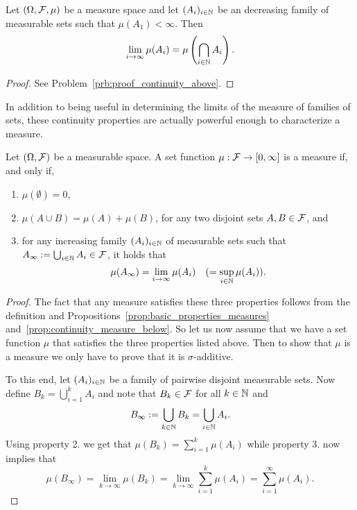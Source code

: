 \begin{proposition}\label{prop:continuity_measure_above}
Let $(\Omega, \mathcal F, \mu)$ be a measure space and let $(A_i)_{i \in \mathbb N}$ be an decreasing family of measurable sets such that $\mu(A_1) < \infty$. Then
\[
	\lim_{i \to \infty} \mu(A_i) = \mu\left(\bigcap_{i \in \mathbb N} A_i\right).
\]
\end{proposition}

\begin{proof}
See Problem~\ref{prb:proof_continuity_above}.
\end{proof}

In addition to being useful in determining the limits of the measure of families of sets, these continuity properties are actually powerful enough to characterize a measure. 

\begin{theorem}
Let $(\Omega, \mathcal F)$ be a measurable space. A set function $\mu : \mathcal F \to [0,\infty]$ is a measure if, and only if,
\begin{enumerate}
\item $\mu(\emptyset) = 0$,
\item $\mu(A \cup B) = \mu(A) + \mu(B)$, for any two disjoint sets $A, B \in \mathcal F$, and
\item for any increasing family $(A_i)_{i \in \mathbb N}$ of measurable sets such that $A_\infty := \bigcup_{i \in \mathbb N} A_i \in \mathcal F$, it holds that
\[
	\mu(A_\infty) = \lim_{i \to \infty} \mu(A_i) \quad (= \sup_{i \in \mathbb N} \mu(A_i)).
\]
\end{enumerate}
\end{theorem}

\begin{proof}
The fact that any measure satisfies these three properties follows from the definition and Propositions~\ref{prop:basic_properties_measures} and~\ref{prop:continuity_measure_below}. So let us now assume that we have a set function $\mu$ that satisfies the three properties listed above. Then to show that $\mu$ is a measure we only have to prove that it is $\sigma$-additive.

To this end, let $(A_i)_{i \in \mathbb N}$ be a family of pairwise disjoint measurable sets. Now define $B_k = \bigcup_{i = 1}^k A_i$ and note that $B_k \in \mathcal F$ for all $k \in \mathbb N$ and
\[
	B_\infty := \bigcup_{k \in \mathbb N} B_k = \bigcup_{i \in \mathbb N} A_i.
\]
Using property 2. we get that $\mu(B_k) = \sum_{i = 1}^k \mu(A_i)$ while property 3. now implies that
\[
	\mu(B_\infty) = \lim_{k \to \infty} \mu(B_k) = \lim_{k \to \infty} \sum_{i = 1}^k \mu(A_i) = \sum_{i = 1}^\infty \mu(A_i). 
\]
\end{proof}

